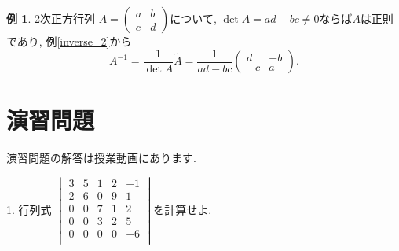 \documentclass[dvipdfmx,a4paper,11pt]{article}
\theoremstyle{definition}
\newtheorem{exa}[thm]{例}
\begin{document}
\begin{exa}
2次正方行列
$
A = 
\begin{pmatrix}
a & b \\
c & d
\end{pmatrix}
$について, $\det A =ad-bc \neq0$ならば$A$は正則であり, 
例\ref{inverse_2}から
$$
A^{-1} = \frac{1}{\det A} \tilde{A}
=\frac{1}{ad-bc}
\begin{pmatrix}
d & -b \\
-c & a
\end{pmatrix}.
$$
\end{exa}

\section{演習問題}
演習問題の解答は授業動画にあります.

1. 行列式
$
\begin{vmatrix}
3 & 5&1 & 2&-1\\
2 & 6&0 & 9&1\\
0 & 0& 7& 1&2\\
0 & 0& 3& 2&5\\
0 & 0& 0& 0&-6\\
\end{vmatrix}
$を計算せよ.


 
\end{document}
